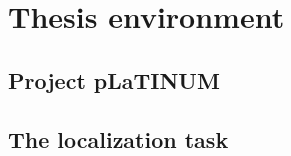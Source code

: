 \section{Thesis environment}
\label{sec:thesis_env}

\subsection{Project pLaTINUM}

\subsection{The localization task}